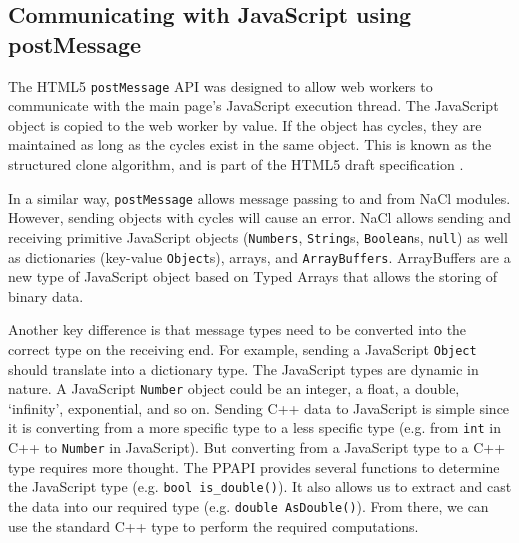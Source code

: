 \subsection{Communicating with JavaScript using postMessage}
The HTML5 \lstinline+postMessage+ API was designed to allow web workers to communicate with the main page's JavaScript execution thread. The JavaScript object is copied to the web worker by value. If the object has cycles, they are maintained as long as the cycles exist in the same object. This is known as the structured clone algorithm, and is part of the HTML5 draft specification \cite{html5w3c}. 

In a similar way, \lstinline+postMessage+ allows message passing to and from NaCl modules. However, sending objects with cycles will cause an error. NaCl allows sending and receiving primitive JavaScript objects (\lstinline+Numbers+, \lstinline+String+s, \lstinline+Boolean+s, \lstinline+null+) as well as dictionaries (key-value \lstinline+Object+s), arrays, and \lstinline+ArrayBuffers+. ArrayBuffers are a new type of JavaScript object based on Typed Arrays \cite{typedarraysw3c} that allows the storing of binary data. 

Another key difference is that message types need to be converted into the correct type on the receiving end. For example, sending a JavaScript \lstinline+Object+ should translate into a dictionary type. The JavaScript types are dynamic in nature. A JavaScript \lstinline+Number+ object could be an integer, a float, a double, `infinity', exponential, and so on. Sending C++ data to JavaScript is simple since it is converting from a more specific type to a less specific type (e.g. from \lstinline+int+ in C++ to \lstinline+Number+ in JavaScript). But converting from a JavaScript type to a C++ type requires more thought. The PPAPI provides several functions to determine the JavaScript type (e.g. \lstinline+bool is_double()+). It also allows us to extract and cast the data into our required type (e.g. \lstinline+double AsDouble()+). From there, we can use the standard C++ type to perform the required computations.
